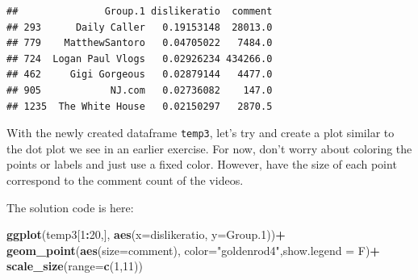 \documentclass[]{article}
\newenvironment{Shaded}{\begin{snugshade}}{\end{snugshade}}
\newcommand{\DataTypeTok}[1]{\textcolor[rgb]{0.13,0.29,0.53}{#1}}
\newcommand{\DecValTok}[1]{\textcolor[rgb]{0.00,0.00,0.81}{#1}}
\newcommand{\FloatTok}[1]{\textcolor[rgb]{0.00,0.00,0.81}{#1}}
\newcommand{\KeywordTok}[1]{\textcolor[rgb]{0.13,0.29,0.53}{\textbf{#1}}}
\newcommand{\NormalTok}[1]{#1}
\newcommand{\OperatorTok}[1]{\textcolor[rgb]{0.81,0.36,0.00}{\textbf{#1}}}
\newcommand{\StringTok}[1]{\textcolor[rgb]{0.31,0.60,0.02}{#1}}
\begin{document}
\begin{Shaded}
\end{Shaded}

\begin{verbatim}
##               Group.1 dislikeratio  comment
## 293      Daily Caller   0.19153148  28013.0
## 779    MatthewSantoro   0.04705022   7484.0
## 724  Logan Paul Vlogs   0.02926234 434266.0
## 462     Gigi Gorgeous   0.02879144   4477.0
## 905            NJ.com   0.02736082    147.0
## 1235  The White House   0.02150297   2870.5
\end{verbatim}

With the newly created dataframe \texttt{temp3}, let's try and create a
plot similar to the dot plot we see in an earlier exercise. For now,
don't worry about coloring the points or labels and just use a fixed
color. However, have the size of each point correspond to the comment
count of the videos.

The solution code is here:

\begin{Shaded}
\begin{Highlighting}[]
\KeywordTok{ggplot}\NormalTok{(temp3[}\DecValTok{1}\OperatorTok{:}\DecValTok{20}\NormalTok{,], }\KeywordTok{aes}\NormalTok{(}\DataTypeTok{x=}\NormalTok{dislikeratio, }\DataTypeTok{y=}\NormalTok{Group}\FloatTok{.1}\NormalTok{))}\OperatorTok{+}
\StringTok{  }\KeywordTok{geom_point}\NormalTok{(}\KeywordTok{aes}\NormalTok{(}\DataTypeTok{size=}\NormalTok{comment), }\DataTypeTok{color=}\StringTok{"goldenrod4"}\NormalTok{,}\DataTypeTok{show.legend =}\NormalTok{ F)}\OperatorTok{+}
\StringTok{  }\KeywordTok{scale_size}\NormalTok{(}\DataTypeTok{range=}\KeywordTok{c}\NormalTok{(}\DecValTok{1}\NormalTok{,}\DecValTok{11}\NormalTok{))}
\end{Highlighting}
\end{Shaded}
\end{document}
